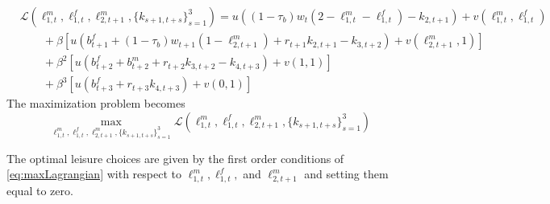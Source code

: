 \documentclass[ProjectUYA]{subfiles}
\begin{document}
\begin{equation}
	\label{eq:lagrangian}
	\begin{aligned}
		&\mathcal{L}(\ell_{1,t}^m,\ell_{1,t}^f,\ell_{2,t+1}^m,\{k_{s+1,t+s}\}_{s=1}^3) = u\left((1-\tau_b)w_t (2-\ell_{1,t}^m - \ell_{1,t}^f) -k_{2,t+1}\right) + v(\ell_{1,t}^m,\ell_{1,t}^f)  \\
		&\qquad + \beta \left[ u\left(b_{t+1}^f+(1-\tau_b)w_{t+1} (1-\ell_{2,t+1}^m ) + r_{t+1}k_{2,t+1} -k_{3,t+2}\right) + v(\ell_{2,t+1}^m,1) \right]\\
		&\qquad + \beta^{2} \left[ u\left(b_{t+2}^f+ b_{t+2}^m  + r_{t+2}k_{3,t+2} -k_{4,t+3}\right) + v(1,1) \right]\\
		&\qquad + \beta^{3} \left[ u\left(b_{t+3}^f + r_{t+3}k_{4,t+3}\right) + v(0,1) \right]
	\end{aligned}
	\end{equation}
 The maximization problem becomes 
\begin{equation}
	\label{eq:maxLagrangian}
	\max_{\ell_{1,t}^m,\ell_{1,t}^f,\ell_{2,t+1}^m,\{k_{s+1,t+s}\}_{s=1}^3} \mathcal{L}(\ell_{1,t}^m,\ell_{1,t}^f,\ell_{2,t+1}^m,\{k_{s+1,t+s}\}_{s=1}^3)
\end{equation}

The optimal leisure choices are given by the first order conditions of \eqref{eq:maxLagrangian} with respect to $\ell_{1,t}^m,\ell_{1,t}^f,$ and $\ell_{2,t+1}^m$ and setting them equal to zero. 
\end{document}
